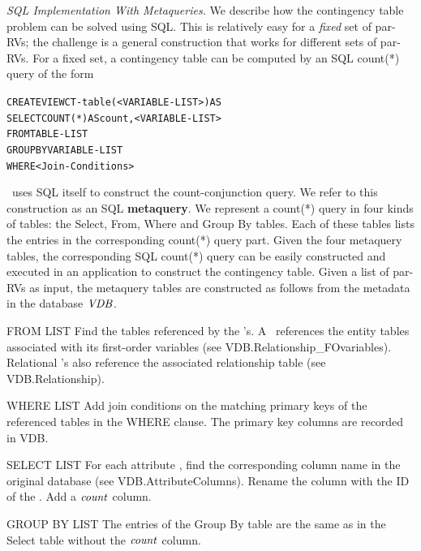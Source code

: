 \documentclass{IEEEtran}
\begin{document}
{\em SQL Implementation With Metaqueries.}
We describe how the contingency table problem can be solved using SQL. %
This is relatively easy for a {\em fixed} set of par-RVs; the challenge is a general construction that works for different sets of par-RVs. For a fixed set, a  contingency table can be computed by an SQL count(*) query of the form 
\begin{alltt}
CREATE VIEW CT-table(<VARIABLE-LIST>) AS
SELECT COUNT(*) AS count, <VARIABLE-LIST>
FROM TABLE-LIST
GROUP BY VARIABLE-LIST
WHERE <Join-Conditions>
\end{alltt}


\FB\ uses SQL itself to construct the count-conjunction query. We refer to this construction as an SQL \textbf{metaquery}. We represent a count(*) query in 
four kinds of tables: the Select, From, Where and Group By tables. Each of these tables lists the entries in the corresponding count(*) query part.
Given the four metaquery tables, the corresponding SQL count(*) query can be easily constructed and executed in an application to construct the contingency table.
Given a list of par-RVs as input, the metaquery tables are constructed as follows
from the metadata in the database ${\it VDB }$.  




\begin{LaTeXdescription}
\item[FROM LIST] Find the tables referenced by the \RRV's. A \RRV ~references the entity tables associated with its first-order variables (see VDB.Relationship\_FOvariables). Relational \RRV's also reference the associated relationship table (see VDB.Relationship). 
\item[WHERE LIST] Add join conditions on the matching primary keys of the referenced tables in the WHERE clause. The primary key columns are recorded in VDB. 
\item[SELECT LIST] For each attribute \RRV, find the corresponding column name in the original database (see VDB.AttributeColumns). Rename the column with the ID of the \RRV. Add a $\it{count}$ column.
\item[GROUP BY LIST] The entries of the Group By table are the same as in the Select table without the $\it{count}$ column.
\end{LaTeXdescription}

\end{document}

